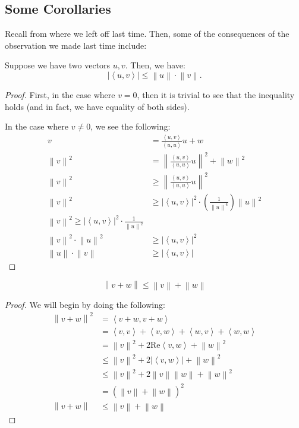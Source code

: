 \documentclass[openany]{book}
\newcommand{\norm}[1]{\left\lVert{#1}\right\rVert}
\newcommand{\innerproduct}[2]{\left\langle{#1}, {#2}\right\rangle}
\begin{document}
\subsection{Some Corollaries}
Recall from where we left off last time. Then, some of the consequences of the observation we made last time include:
\begin{thm}
	Suppose we have two vectors $u,v$. Then, we have:
	\begin{equation*}
		\lvert \innerproduct{u}{v} \rvert \leq \norm{u} \cdot \norm{v}.
	\end{equation*}
\end{thm}
\begin{proof}
	First, in the case where $v = 0$, then it is trivial to see that the inequality holds (and in fact, we have equality of both sides).
	
	In the case where $v \neq 0$, we see the following:
	\begin{align*}
		v &= \frac{\innerproduct{u}{v}}{\innerproduct{u}{u}}u + w \tag{$u \perp w$} \\
		\norm{v}^{2} &= \norm{\frac{\innerproduct{u}{v}}{\innerproduct{u}{u}} u}^{2} + \norm{w}^{2} \tag{By Pythagorean Theorem} \\
		\norm{v}^{2} &\geq \norm{\frac{\innerproduct{u}{v}}{\innerproduct{u}{u}} u}^{2} \\
		\norm{v}^{2} &\geq \lvert \innerproduct{u}{v} \rvert^{2} \cdot \left( \frac{1}{\norm{u}^{4}} \right) \norm{u}^{2} \\
		\norm{v}^{2} \geq \lvert \innerproduct{u}{v} \rvert^{2} \cdot \frac{1}{\norm{u}^{2}} \\
		\norm{v}^{2} \cdot \norm{u}^{2} &\geq \lvert \innerproduct{u}{v} \rvert^{2} \\
		\norm{u} \cdot \norm{v} &\geq \lvert \innerproduct{u}{v} \rvert
	\end{align*}
\end{proof}

\begin{cor}
	\begin{equation*}
		\norm{v + w} \leq \norm{v} + \norm{w}
	\end{equation*}
\end{cor}
\begin{proof}
	We will begin by doing the following:
	\begin{align*}
		\norm{v+w}^{2} &= \innerproduct{v+w}{v+w} \\
		&= \innerproduct{v}{v} + \innerproduct{v}{w} + \innerproduct{w}{v} + \innerproduct{w}{w} \\
		&= \norm{v}^{2} + 2\mathrm{Re} \innerproduct{v}{w} + \norm{w}^{2} \\
		&\leq \norm{v}^{2} + 2\lvert \innerproduct{v}{w} \rvert + \norm{w}^{2} \\
		&\leq \norm{v}^{2} + 2\norm{v}\norm{w} + \norm{w}^{2} \\
		&= (\norm{v} + \norm{w})^{2} \\
		\norm{v+w} &\leq \norm{v} + \norm{w}
	\end{align*}
\end{proof}
\end{document}

